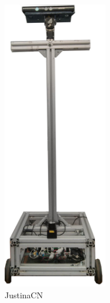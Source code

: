 \documentclass[letterpaper,12pt]{article}
\begin{document}
\begin{figure}
\centering
\begin{subfigure}{0.45\textwidth}
  \centering
  \includegraphics[width=0.5\textwidth]{Figures/JustinaCN.jpg}
  \caption{JustinaCN}
  \label{fig:JustinaCN}
\end{subfigure}
\begin{subfigure}{0.45\textwidth}
  \centering

\end{subfigure}
\end{figure}
\end{document}
